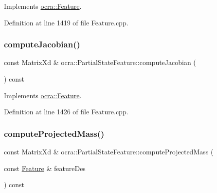 Implements \hyperlink{classocra_1_1Feature_a4fb8eeeed978a1f727ec43cd1bd18d78}{ocra\+::\+Feature}.



Definition at line 1419 of file Feature.\+cpp.

\hypertarget{classocra_1_1PartialStateFeature_a134ada6399c8f4bda311844c79cd5467}{}\label{classocra_1_1PartialStateFeature_a134ada6399c8f4bda311844c79cd5467} 
\subsubsection{\texorpdfstring{compute\+Jacobian()}{computeJacobian()}\hspace{0.1cm}{\footnotesize\ttfamily [2/2]}}
{\footnotesize\ttfamily const Matrix\+Xd \& ocra\+::\+Partial\+State\+Feature\+::compute\+Jacobian (\begin{DoxyParamCaption}{ }\end{DoxyParamCaption}) const\hspace{0.3cm}{\ttfamily [virtual]}}



Implements \hyperlink{classocra_1_1Feature_adbab3b388657555abb805bb971c2491f}{ocra\+::\+Feature}.



Definition at line 1426 of file Feature.\+cpp.

\hypertarget{classocra_1_1PartialStateFeature_a9554341f9015361e4c7dc544f6415470}{}\label{classocra_1_1PartialStateFeature_a9554341f9015361e4c7dc544f6415470} 
\subsubsection{\texorpdfstring{compute\+Projected\+Mass()}{computeProjectedMass()}\hspace{0.1cm}{\footnotesize\ttfamily [1/2]}}
{\footnotesize\ttfamily const Matrix\+Xd \& ocra\+::\+Partial\+State\+Feature\+::compute\+Projected\+Mass (\begin{DoxyParamCaption}\item[{const \hyperlink{classocra_1_1Feature}{Feature} \&}]{feature\+Des }\end{DoxyParamCaption}) const\hspace{0.3cm}{\ttfamily [virtual]}}



